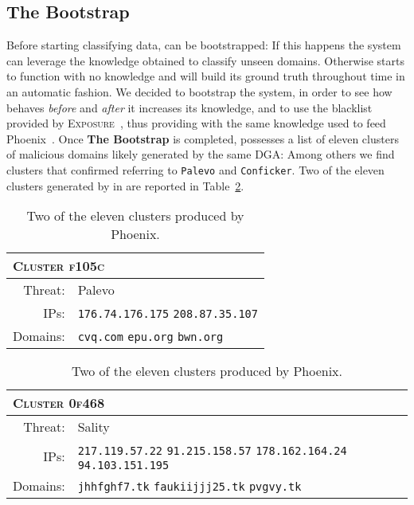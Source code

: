 \subsection{The Bootstrap} %
\label{sub:the_bootstrap_validation}
Before starting classifying data, \thesystem can be bootstrapped: If this happens the system can leverage the knowledge obtained to classify unseen domains. Otherwise \thesystem starts to function with no knowledge and will build its ground truth throughout time in an automatic fashion. We decided to bootstrap the system, in order to see how \thesystem behaves \emph{before} and \emph{after}
it increases its knowledge, and
to use the blacklist provided by \textsc{Exposure}~\cite{bilge2011exposure},
thus providing \thesystem with the same knowledge used to feed Phoenix~\cite{schiavoni2013}. Once \textbf{The Bootstrap} is completed, \thesystem
possesses a list of eleven clusters of malicious domains likely generated by the
same DGA: Among others we find clusters that \citet{schiavoni2013} confirmed  referring to \texttt{Palevo} and \texttt{Conficker}.
Two of the eleven clusters generated by \phoenix in
 are reported in Table~\ref{tab:phoenix_clusters}.
\begin{table}[!htp]
\begin{minipage}{.5\textwidth}
\centering
\begin{tabular}{rp{2.8cm}}
\multicolumn{2}{l}{\textsc{Cluster f105c}} \\
\midrule
Threat: & Palevo \\
IPs: & \texttt{176.74.176.175} \newline \texttt{208.87.35.107} \newline \newline \\
Domains: & \texttt{cvq.com} \newline \texttt{epu.org} \newline \texttt{bwn.org} \\
\end{tabular}
\end{minipage}%
\begin{minipage}{.5\textwidth}
\centering
\begin{tabular}{rp{2.8cm}}
\multicolumn{2}{l}{\textsc{Cluster 0f468}} \\
\midrule
Threat: & Sality \\
IPs: & \texttt{217.119.57.22} \newline \texttt{91.215.158.57} \newline \texttt{178.162.164.24} \newline \texttt{94.103.151.195} \\
Domains: & \texttt{jhhfghf7.tk} \newline \texttt{faukiijjj25.tk} \newline \texttt{pvgvy.tk} \\
\end{tabular}
\end{minipage}
\caption{Two of the eleven clusters produced by Phoenix.}
\label{tab:phoenix_clusters}
\end{table}
